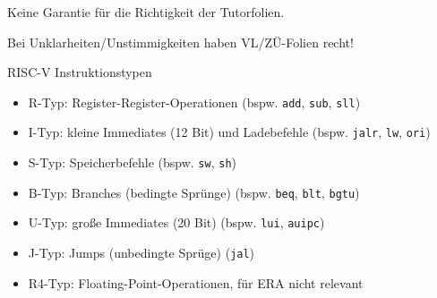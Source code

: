 \documentclass[
  german,            %
  aspectratio=169,    %
]{tumbeamer}
\begin{document}
\begin{frame}[c, fragile]{}{}
	\begin{center}
		\LARGE  Keine Garantie für die Richtigkeit der Tutorfolien.

		\Large Bei Unklarheiten/Unstimmigkeiten haben VL/ZÜ-Folien recht!
	\end{center}
\end{frame}

\begin{frame}[c, fragile]{RISC-V Instruktionstypen}{}
	\begin{itemize}
		\item R-Typ: Register-Register-Operationen (bspw. \texttt{add}, \texttt{sub}, \texttt{sll})
		\item I-Typ: kleine Immediates (12 Bit) und Ladebefehle (bspw. \texttt{jalr}, \texttt{lw}, \texttt{ori})
		\item S-Typ: Speicherbefehle (bspw. \texttt{sw}, \texttt{sh})
		\item B-Typ: Branches (bedingte Sprünge) (bspw. \texttt{beq}, \texttt{blt}, \texttt{bgtu})
		\item U-Typ: große Immediates (20 Bit) (bspw. \texttt{lui}, \texttt{auipc})
		\item J-Typ: Jumps (unbedingte Sprüge) (\texttt{jal})
		\item R4-Typ: Floating-Point-Operationen, für ERA nicht relevant
	\end{itemize}
\end{frame}
\end{document}
